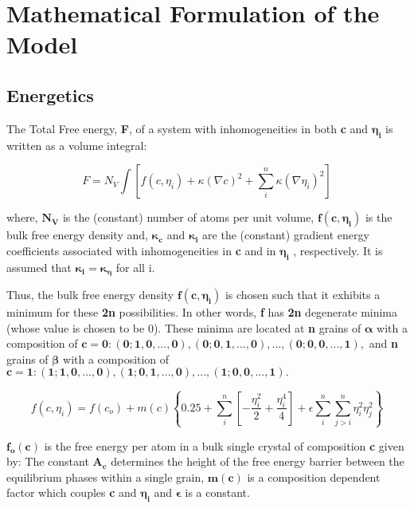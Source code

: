 \chapter{Mathematical Formulation of the Model}

\section{Energetics}
The Total Free energy, \textbf{F}, of a system with inhomogeneities in both \textbf{c} and $\mathbold{\eta_{i}}$ is written as a volume integral:

\begin{equation}
F=N_V\int\left[f(c,\eta_i)+ \kappa(\nabla c)^2 +\sum_i^n \kappa(\nabla \eta_i)^2    \right] 
\end{equation}

where, 
$\mathbold{N_V}$ is the (constant) number of atoms per unit volume,
$\mathbold{f(c,\eta_{i})}$ is the bulk free energy density and, 
$\mathbold{\kappa_{c}}$ and $\mathbold{\kappa_{i}}$ are the (constant) gradient energy coefficients associated with inhomogeneities in \textbf{c} and in $\mathbold{\eta_{i}}$ , respectively. 
It is assumed that $\mathbold{\kappa_{i}=\kappa_{\eta}}$ for all i.

Thus, the bulk free energy density $\mathbold{f(c,\eta_{i})}$ is chosen such that it exhibits a minimum for these \textbf{2n} possibilities. In other words, \textbf{f} has \textbf{2n} degenerate minima (whose value is chosen to be 0). 
These minima are located at \textbf{n} grains of  $\mathbold{\alpha}$ with a composition of $\mathbold{c = 0:(0;1,0,...,0), (0;0,1,...,0),...,(0;0,0,...,1),}$ and \textbf{n} grains of $\mathbold{\beta}$ with a composition of \\
$\mathbold{c = 1:(1;1,0,...,0), (1;0,1,...,0),...,(1;0,0,...,1).}$


\begin{equation}
f(c,\eta_i)=f(c_o)+m(c)\left\{  0.25+\sum_i^n \left[- \frac{\eta_i^2}{2}+ \frac{\eta_i^4}{4}\right] + \epsilon\sum_i^n\sum_{j>i}^n \eta_i^2\eta_j^2 \right\}
\end{equation}


$\mathbold{f_o(c)}$ is the free energy per atom in a bulk single crystal of composition \textbf{c} given by: The constant $\mathbold{A_c}$ determines the height of the free energy barrier between the equilibrium phases within a single grain, $\mathbold{m(c)}$ is a composition dependent factor which couples \textbf{c} and $\mathbold{\eta_{i}}$ and $\mathbold{\epsilon}$ is a constant. 

